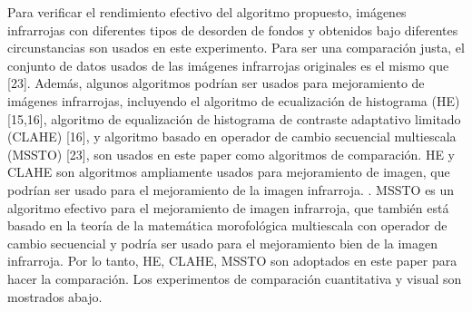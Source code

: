 \documentclass[a4paper, 11 pt, conference]{ieeeconf}      %
\begin{document}
Para verificar el rendimiento efectivo del algoritmo propuesto, im\'agenes infrarrojas con diferentes tipos de desorden de fondos y obtenidos bajo diferentes circunstancias son usados en este experimento. Para ser una comparaci\'on justa, el conjunto de datos usados de las im\'agenes infrarrojas originales es el mismo que [23]. Adem\'as, algunos algoritmos podr\'ian ser usados para mejoramiento de im\'agenes infrarrojas, incluyendo el algoritmo de ecualizaci\'on de histograma (HE)[15,16], algoritmo de equalizaci\'on  de histograma de contraste adaptativo limitado (CLAHE) [16],  y algoritmo basado en operador de cambio secuencial multiescala (MSSTO) [23], son usados en este paper como algoritmos de comparaci\'on. HE y CLAHE son algoritmos ampliamente usados para mejoramiento de imagen, que podr\'ian ser usado para el mejoramiento de la imagen infrarroja. . MSSTO es un algoritmo efectivo para el mejoramiento de imagen infrarroja, que tambi\'en est\'a basado en la teor\'ia de la matem\'atica morofol\'ogica multiescala con operador de cambio secuencial y podr\'ia ser usado para el mejoramiento bien de la imagen infrarroja. Por lo tanto, HE, CLAHE, MSSTO son adoptados en este paper para hacer la comparaci\'on. Los experimentos de comparaci\'on cuantitativa y visual son mostrados abajo.
\end{document}
